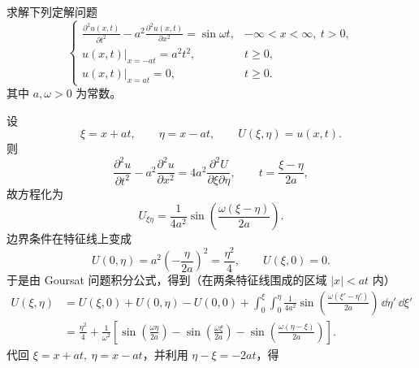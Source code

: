 ﻿


\begin{question}[第1题（20分）]

求解下列定解问题
\[
\begin{cases}
\displaystyle \frac{\partial^2 u(x,t)}{\partial t^2} - a^2 \frac{\partial^2 u(x,t)}{\partial x^2} = \sin\omega t, & -\infty < x < \infty,\ t>0,\\[6pt]
\displaystyle u(x,t)\big|_{x=-at} = a^2 t^2, & t\geq 0,\\[6pt]
\displaystyle u(x,t)\big|_{x=at} = 0, & t\geq 0.
\end{cases}
\]
其中 $a,\omega>0$ 为常数。

\begin{solution}

设
\[
\xi=x+at,\qquad \eta=x-at,\qquad U(\xi,\eta)=u(x,t).
\]
则
\[
\frac{\partial^2 u}{\partial t^2}-a^2\frac{\partial^2 u}{\partial x^2}=4a^2\frac{\partial^2 U}{\partial \xi\partial \eta},
\qquad t=\frac{\xi-\eta}{2a},
\]
故方程化为
\[
U_{\xi\eta}=\frac{1}{4a^2}\sin\!\left(\frac{\omega(\xi-\eta)}{2a}\right).
\]
边界条件在特征线上变成
\[
U(0,\eta)=a^2\!\left(-\frac{\eta}{2a}\right)^2=\frac{\eta^2}{4},
\qquad
U(\xi,0)=0.
\]
于是由 Goursat 问题积分公式，得到（在两条特征线围成的区域 $|x|<at$ 内）
\[
\begin{aligned}
U(\xi,\eta)
&=U(\xi,0)+U(0,\eta)-U(0,0)
+\int_0^{\xi}\int_0^{\eta}
\frac{1}{4a^2}\sin\!\left(\frac{\omega(\xi'-\eta')}{2a}\right)
\,\dd{\eta'}\,\dd{\xi'}\\
&=\frac{\eta^2}{4}+\frac{1}{\omega^2}\left[
\sin\!\left(\frac{\omega\eta}{2a}\right)
-\sin\!\left(\frac{\omega\xi}{2a}\right)
-\sin\!\left(\frac{\omega(\eta-\xi)}{2a}\right)
\right].
\end{aligned}
\]
代回 $\xi=x+at,\ \eta=x-at$，并利用 $\eta-\xi=-2at$，得

\end{solution}
\end{question}

